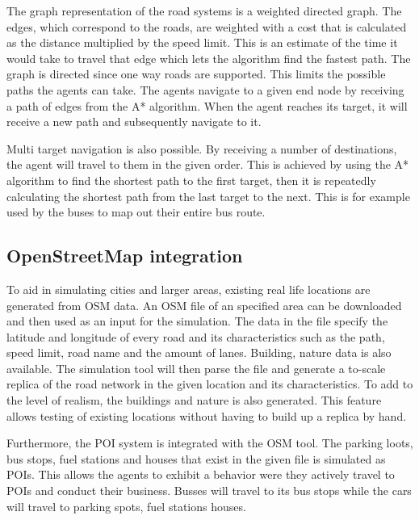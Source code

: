     
        The graph representation of the road systems is a weighted directed graph. The edges, which correspond to the roads, are weighted with a cost that is calculated as the distance multiplied by the speed limit. This is an estimate of the time it would take to travel that edge which lets the algorithm find the fastest path. The graph is directed since one way roads are supported. This limits the possible paths the agents can take. The agents navigate to a given end node by receiving a path of edges from the A* algorithm. When the agent reaches its target, it will receive a new path and subsequently navigate to it.
        
        Multi target navigation is also possible. By receiving a number of destinations, the agent will travel to them in the given order. This is achieved by using the A* algorithm to find the shortest path to the first target, then it is repeatedly calculating the shortest path from the last target to the next. This is for example used by the buses to map out their entire bus route.
        

    \subsection{OpenStreetMap integration}
        To aid in simulating cities and larger areas, existing real life locations are generated from OSM data. An OSM file of an specified area can be downloaded and then used as an input for the simulation. The data in the file specify the latitude and longitude of every road and its characteristics such as the path, speed limit, road name and the amount of lanes. Building, nature data is also available. The simulation tool will then parse the file and generate a to-scale replica of the road network in the given location and its characteristics. To add to the level of realism, the buildings and nature is also generated. This feature allows testing of existing locations without having to build up a replica by hand.

        Furthermore, the POI system is integrated with the OSM tool. The parking loots, bus stops, fuel stations and houses that exist in the given file is simulated as POIs. This allows the agents to exhibit a behavior were they actively travel to POIs and conduct their business. Busses will travel to its bus stops while the cars will travel to parking spots, fuel stations houses.


